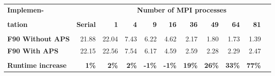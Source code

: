 \begin{tabular}{lrrrrrrrrrr}\toprule
\textbf{Implemen-} & &\multicolumn{8}{c}{\textbf{Number of MPI processes}} \\
\cline{3-10}\vspace{-10pt} &\textbf{} &\textbf{} &\textbf{} &\textbf{} &\textbf{} &\textbf{} &\textbf{} &\textbf{} &\textbf{} \\
\textbf{tation} &\textbf{Serial} &\textbf{1} &\textbf{4} &\textbf{9} &\textbf{16} &\textbf{36} &\textbf{49} &\textbf{64} &\textbf{81}\vspace{2pt} \\
\midrule[0.1pt]\vspace{-10pt} & & & & & & & & & \\
\textbf{F90 Without APS} &21.88 &22.04 &7.43 &6.22 &4.62 &2.17 &1.80 &1.73 &1.39 \\
\textbf{F90 With APS} &22.15 &22.56 &7.54 &6.17 &4.59 &2.59 &2.28 &2.29 &2.47 \\
\midrule[0.1pt]\vspace{-10pt} & & & & & & & & & \\
\textbf{Runtime increase} &\textbf{1\%} &\textbf{2\%} &\textbf{2\%} &\textbf{-1\%} &\textbf{-1\%} &\textbf{19\%} &\textbf{26\%} &\textbf{33\%} &\textbf{77\%} \\
\bottomrule
\end{tabular}